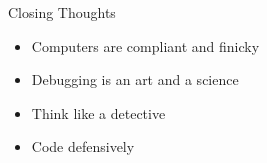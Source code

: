 \documentclass{beamer}
\begin{document}
\begin{frame}[fragile]{Closing Thoughts}


\begin{itemize}
\item Computers are compliant and finicky
\item Debugging is an art and a science
\item Think like a detective
\item Code defensively
\end{itemize}


\end{frame}
\end{document}
